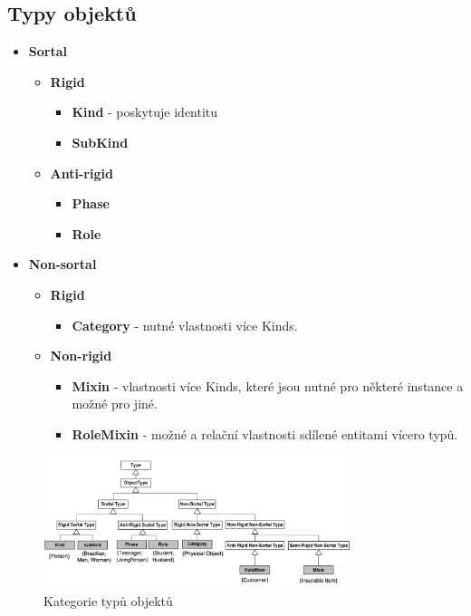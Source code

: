 \documentclass{szzclass}
\begin{document}
\subsection{Typy objektů}
\begin{itemize}
\item \textbf{Sortal}
  \begin{itemize}
  \item \textbf{Rigid}
    \begin{itemize}
    \item \textbf{Kind} - poskytuje identitu
    \item \textbf{SubKind}
    \end{itemize}
  \item \textbf{Anti-rigid}
    \begin{itemize}
    \item \textbf{Phase}
    \item \textbf{Role}
    \end{itemize}
  \end{itemize}
\item \textbf{Non-sortal}
  \begin{itemize}
  \item \textbf{Rigid}
    \begin{itemize}
    \item \textbf{Category} - nutné vlastnosti více Kinds.
    \end{itemize}
  \item \textbf{Non-rigid}
    \begin{itemize}
    \item \textbf{Mixin} - vlastnosti více Kinds, které jsou nutné pro některé instance a možné pro jiné.
    \item \textbf{RoleMixin} - možné a relační vlastnosti sdílené entitami vícero typů.
    \end{itemize}
  \end{itemize}
\end{itemize}

\begin{figure}[h!]
  \centering
  \includegraphics[width=0.8\textwidth]{topics/bi-wsi-si-06/images/type-categories}
  \caption{Kategorie typů objektů}
\end{figure}
\end{document}
